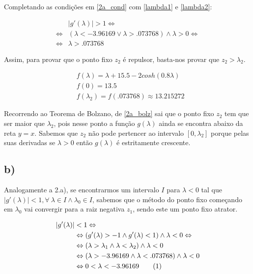 \documentclass[a4paper, 18pt]{article}
\begin{document}
	\par
	Completando as condições em \eqref{2a_cond} com \eqref{lambda1} e \eqref{lambda2}:

	\begin{align*}
		&|g'(\lambda)| > 1 \Leftrightarrow \\ \Leftrightarrow
		&(\lambda < -3.96169 \vee \lambda > .073768) \wedge \lambda > 0 \Leftrightarrow \\ \Leftrightarrow
		&\lambda > .073768
	\end{align*}

	\par
	Assim, para provar que o ponto fixo $z_2$ é repulsor, basta-nos provar que $z_2 > \lambda_2$.

	\begin{equation} \label{2a_bolz}
	\begin{split}
		&f(\lambda) = \lambda + 15.5 - 2cosh(0.8\lambda) \\
		&f(0) = 13.5 \\
		&f(\lambda_2) = f(.073768) \approx 13.215272
	\end{split}
	\end{equation}

	\par
	Recorrendo ao Teorema de Bolzano, de \eqref{2a_bolz} sai que o ponto fixo $z_2$ tem que ser maior que $\lambda_2$, pois nesse ponto a função $g(\lambda)$ ainda se encontra abaixo da reta $y = x$. Sabemos que $z_2$ não pode pertencer ao intervalo $[0, \lambda_2]$ porque pelas suas derivadas se $\lambda > 0$ então $g(\lambda)$ é estritamente crescente.

\subsection*{b)}
	\par
	Analogamente a 2.a), se encontrarmos um intervalo $I$ para $\lambda < 0$ tal que $|g'(\lambda)| < 1, \forall \> \lambda \in I \wedge \lambda_0 \in I$, sabemos que o método do ponto fixo começando em $\lambda_0$ vai convergir para a raiz negativa $z_1$, sendo este um ponto fixo atrator.

	\par

	\begin{align*}
		|g'(\lambda)| &< 1 \Leftrightarrow \\ &\Leftrightarrow
		(g'(\lambda) > -1 \wedge g'(\lambda) < 1) \wedge \lambda < 0 \Leftrightarrow \\ &\Leftrightarrow
		(\lambda > \lambda_1 \wedge \lambda < \lambda_2) \wedge \lambda < 0 \\ &\Leftrightarrow
		(\lambda > -3.96169 \wedge \lambda < .073768) \wedge \lambda < 0  \stepcounter{equation} \\ &\Leftrightarrow
		0 < \lambda < -3.96169 \tag{\theequation}
	\end{align*}
\end{document}
